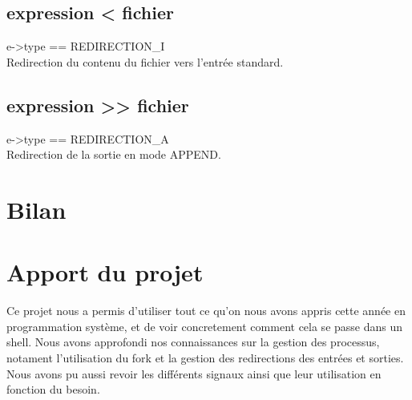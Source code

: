 \documentclass[12pt]{article}
\begin{document}
\subsection{expression < fichier}
e->type == REDIRECTION\_I\\
Redirection du contenu du fichier vers l'entrée standard.
   

\subsection{expression >> fichier}
e->type == REDIRECTION\_A\\
Redirection de la sortie en mode APPEND.   


\newpage
\section{Bilan}

\newpage
\section{Apport du projet}
Ce projet nous a permis d'utiliser tout ce qu'on nous avons appris cette année en programmation système, et de voir concretement comment cela se passe dans un shell.
Nous avons approfondi nos connaissances sur la gestion des processus, notament l'utilisation du fork et la gestion des redirections des entrées et sorties.
Nous avons pu aussi revoir les différents signaux ainsi que leur utilisation en fonction du besoin.
\end{document}
